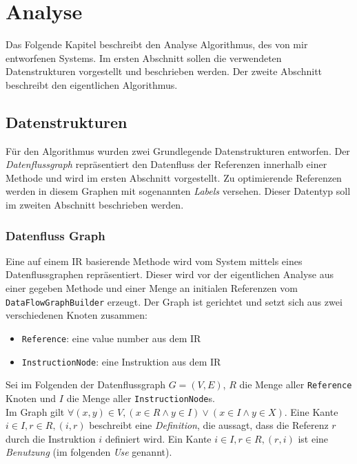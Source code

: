 \chapter{Analyse}

Das Folgende Kapitel beschreibt den Analyse Algorithmus, des von mir entworfenen Systems.
Im ersten Abschnitt sollen die verwendeten Datenstrukturen vorgestellt und beschrieben werden.
Der zweite Abschnitt beschreibt den eigentlichen Algorithmus.

\section{Datenstrukturen}

Für den Algorithmus wurden zwei Grundlegende Datenstrukturen entworfen. Der 
\textit{Datenflussgraph} repräsentiert den Datenfluss der Referenzen innerhalb 
einer Methode und wird im ersten Abschnitt vorgestellt. Zu optimierende Referenzen
werden in diesem Graphen mit sogenannten \textit{Labels} versehen. Dieser Datentyp
soll im zweiten Abschnitt beschrieben werden.

\subsection{Datenfluss Graph}

Eine auf einem IR basierende Methode wird vom System mittels eines Datenflussgraphen 
repräsentiert. Dieser wird vor der eigentlichen Analyse aus einer gegeben
Methode und einer Menge an initialen Referenzen vom \texttt{DataFlowGraphBuilder}
erzeugt. Der Graph ist gerichtet und setzt sich aus zwei verschiedenen Knoten zusammen:

\begin{itemize}
	\item \texttt{Reference}: eine value number aus dem IR
	\item \texttt{InstructionNode}: eine Instruktion aus dem IR
\end{itemize}

Sei im Folgenden der Datenflussgraph $G = (V, E)$, $R$ die Menge aller \texttt{Reference} 
Knoten und $I$ die Menge aller \texttt{InstructionNode}s. 
\\
Im Graph gilt $\forall (x, y) \in V,  (x \in R \wedge y \in I) \vee (x \in I \wedge y \in X)$.
Eine Kante $i \in I, r \in R, (i, r)$ beschreibt eine \textit{Definition}, die aussagt, 
dass die Referenz $r$ durch die Instruktion $i$ definiert wird. Ein Kante 
$i \in I, r \in R, (r, i)$ ist eine \textit{Benutzung} (im folgenden \textit{Use}
genannt). 

